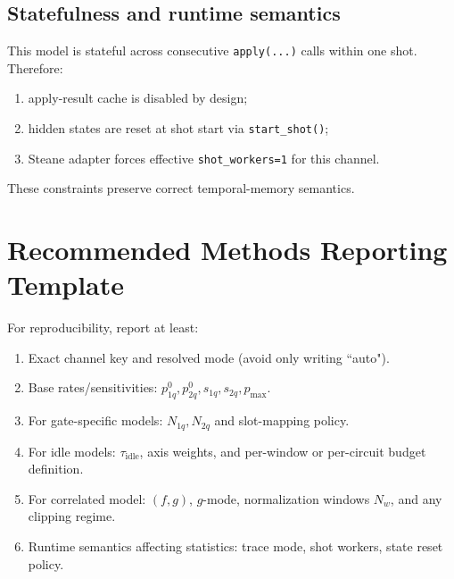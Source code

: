 \documentclass[11pt]{article}
\begin{document}
\subsection{Statefulness and runtime semantics}
This model is stateful across consecutive \texttt{apply(...)} calls within one shot.
Therefore:
\begin{enumerate}[label=\textbf{R\arabic*}.]
\item apply-result cache is disabled by design;
\item hidden states are reset at shot start via \texttt{start\_shot()};
\item Steane adapter forces effective \texttt{shot\_workers=1} for this channel.
\end{enumerate}
These constraints preserve correct temporal-memory semantics.

\section{Recommended Methods Reporting Template}

For reproducibility, report at least:
\begin{enumerate}[leftmargin=2em]
\item Exact channel key and resolved mode (avoid only writing ``auto").
\item Base rates/sensitivities: $p_{1q}^{0},p_{2q}^{0},s_{1q},s_{2q},p_{\max}$.
\item For gate-specific models: $N_{1q},N_{2q}$ and slot-mapping policy.
\item For idle models: $\tau_{\mathrm{idle}}$, axis weights, and per-window or per-circuit budget definition.
\item For correlated model: $(f,g)$, $g$-mode, normalization windows $N_w$, and any clipping regime.
\item Runtime semantics affecting statistics: trace mode, shot workers, state reset policy.
\end{enumerate}
\end{document}
